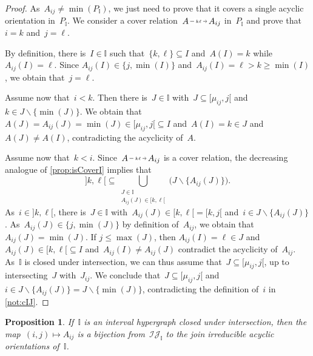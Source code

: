\documentclass{amsart}
\newtheorem{proposition}[theorem]{Proposition}
\theoremstyle{definition}
\newcommand{\cal}[1]{\mathcal{#1}} %
\newcommand{\ssm}{\smallsetminus} %
\newcommand{\II}{\mathbb I} %
\newcommand{\cIJ}{\cal{IJ}} %
\newcommand{\flip}[4]{\ensuremath{#1 \, \begin{tikzpicture}[scale=1,baseline=-.1cm] \path[->]  (0,0) edge node[fill=white,inner sep=2pt, font=\tiny ] {$#2#3$} (.7,0); \end{tikzpicture} \, #4}}
\begin{document}
\begin{proof}
As~$A_{ij} \ne \min(P_\II)$, we just need to prove that it covers a single acyclic orientation in~$P_\II$.
We consider a cover relation~\flip{A}{k}{\ell}{A_{ij}} in~$P_\II$ and prove that~$i = k$ and~$j = \ell$.

By definition, there is~$I \in \II$ such that~$\{k,\ell\} \subseteq I$ and~$A(I) = k$ while~$A_{ij}(I) = \ell$.
Since $A_{ij}(I) \in \{j, \min(I)\}$ and~$A_{ij}(I) = \ell > k \ge \min(I)$, we obtain that~$j = \ell$.

Assume now that~$i < k$.
Then there is~$J \in \II$ with~$J \subseteq [\mu_{ij}, j[$ and~$k \in J \ssm \{\min(J)\}$.
We obtain that~$A(J) = A_{ij}(J) = \min(J) \in [\mu_{ij}, j[ \subseteq I$ and~$A(I) = k \in J$ and~$A(J) \ne A(I)$, contradicting the acyclicity of~$A$.

Assume now that~$k < i$.
Since~$\flip{A}{k}{\ell}{A_{ij}}$ is a cover relation, the decreasing analogue of \cref{prop:isCoverI} implies that
\[
{]k,\ell[} \subseteq \!\!\!\! \bigcup_{\substack{J \in \II \\ A_{ij}(J) \in [k,\ell[}} \!\!\!\! \big( J \ssm \{A_{ij}(J)\} \big).
\]
As~$i \in {]k,\ell[}$, there is~$J \in \II$ with~$A_{ij}(J) \in {[k,\ell[} = {[k,j[}$ and~$i \in J \ssm \{A_{ij}(J)\}$.
As~${A_{ij}(J) \in \{j, \min(J)\}}$ by definition of~$A_{ij}$, we obtain that~$A_{ij}(J) = \min(J)$.
If $j \le \max(J)$, then $A_{ij}(I) = \ell \in J$ and~$A_{ij}(J) \in {[k,\ell[} \subseteq I$ and~$A_{ij}(I) \ne A_{ij}(J)$ contradict the acyclicity of~$A_{ij}$.
As~$\II$ is closed under intersection, we can thus assume that~$J \subseteq [\mu_{ij}, j[$, up to intersecting~$J$ with~$J_{ij}$.
We conclude that~$J \subseteq [\mu_{ij}, j[$ and~$i \in J \ssm \{A_{ij}(J)\} = J \ssm \{\min(J)\}$, contradicting the definition of~$i$ in \cref{not:cIJ}.
\end{proof}

\begin{proposition}
\label{prop:joinIrreducibles}
If~$\II$ is an interval hypergraph closed under intersection, then the map~${(i,j) \mapsto A_{ij}}$ is a bijection from~$\cIJ_\II$ to the join irreducible acyclic orientations of~$\II$.
\end{proposition}
\end{document}
